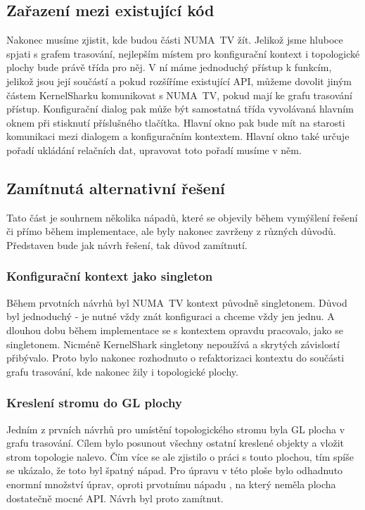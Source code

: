\subsection{Zařazení mezi existující kód}
Nakonec musíme zjistit, kde budou části NUMA~TV žít. Jelikož jsme hluboce spjati s grafem trasování, nejlepším místem pro konfigurační kontext i topologické plochy bude právě třída pro něj. V ní máme jednoduchý přístup k  funkcím, jelikož jsou její součástí a pokud rozšíříme existující API, můžeme dovolit jiným částem KernelSharku komunikovat s NUMA~TV, pokud mají ke grafu trasování přístup. Konfigurační dialog pak může být samostatná třída vyvolávaná hlavním oknem při stisknutí příslušného tlačítka. Hlavní okno pak bude mít na starosti komunikaci mezi dialogem a konfiguračním kontextem. Hlavní okno také určuje pořadí ukládání relačních dat, upravovat toto pořadí musíme v něm.


\subsection{Zamítnutá alternativní řešení}
Tato část je souhrnem několika nápadů, které se objevily během vymýšlení řešení či přímo během implementace, ale byly nakonec zavrženy z různých důvodů. Představen bude jak návrh řešení, tak důvod zamítnutí.

\subsubsection*{Konfigurační kontext jako singleton}
Během prvotních návrhů byl NUMA~TV kontext původně singletonem. Důvod byl jednoduchý - je nutné vždy znát konfiguraci a chceme vždy jen jednu. A dlouhou dobu během implementace se s kontextem opravdu pracovalo, jako se singletonem. Nicméně KernelShark singletony nepoužívá a skrytých závislostí přibývalo. Proto bylo nakonec rozhodnuto o refaktorizaci kontextu do součásti grafu trasování, kde nakonec žily i topologické plochy.

\subsubsection*{Kreslení stromu do GL plochy}
Jedním z prvních návrhů pro umístění topologického stromu byla GL plocha v grafu trasování. Cílem bylo posunout všechny ostatní kreslené objekty a vložit strom topologie nalevo. Čím více se ale zjistilo o práci s touto plochou, tím spíše se ukázalo, že toto byl špatný nápad. Pro úpravu v této ploše bylo odhadnuto enormní množství úprav, oproti prvotnímu nápadu , na který neměla plocha dostatečně mocné API. Návrh byl proto zamítnut.

